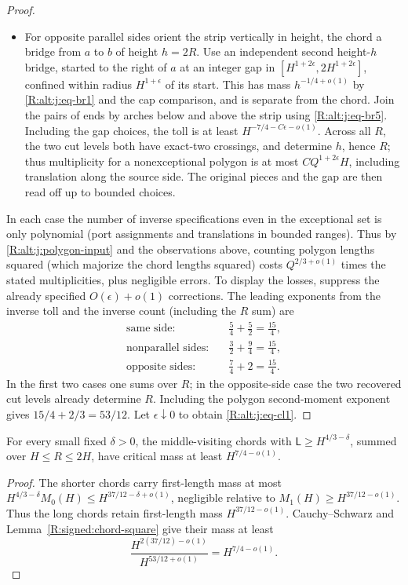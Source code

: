 \begin{proof}
\begin{itemize}
\item For opposite parallel sides orient the strip vertically in height, the chord a bridge from $a$ to $b$ of height $h=2R$. Use an independent second height-$h$ bridge, started to the right of $a$ at an integer gap in $[H^{1+2\epsilon},2H^{1+2\epsilon}]$, confined within radius $H^{1+\epsilon}$ of its start. This has mass $h^{-1/4+o(1)}$ by \eqref{R:alt:j:eq-br1} and the cap comparison, and is separate from the chord. Join the pairs of ends by arches below and above the strip using \eqref{R:alt:j:eq-br5}. Including the gap choices, the toll is at least $H^{-7/4-C\epsilon-o(1)}$. Across all $R$, the two cut levels both have exact-two crossings, and determine $h$, hence $R$; thus multiplicity for a nonexceptional polygon is at most $C Q^{1+2\epsilon}H$, including translation along the source side. The original pieces and the gap are then read off up to bounded choices.

\end{itemize}
In each case the number of inverse specifications even in the exceptional set is only polynomial (port assignments and translations in bounded ranges). Thus by \eqref{R:alt:j:polygon-input} and the observations above, counting polygon lengths squared (which majorize the chord lengths squared) costs $Q^{2/3+o(1)}$ times the stated multiplicities, plus negligible errors. To display the losses, suppress the already specified $O(\epsilon)+o(1)$ corrections. The leading exponents from the inverse toll and the inverse count (including the $R$ sum) are
\[
\begin{aligned}
\text{same side:}&\quad \tfrac54+\tfrac52=\tfrac{15}4,\\
\text{nonparallel sides:}&\quad \tfrac32+\tfrac94=\tfrac{15}4,\\
\text{opposite sides:}&\quad \tfrac74+2=\tfrac{15}4.
\end{aligned}
\]
In the first two cases one sums over $R$; in the opposite-side case the two recovered cut levels already determine $R$. Including the polygon second-moment exponent gives $15/4+2/3=53/12$. Let $\epsilon\downarrow0$ to obtain \eqref{R:alt:j:eq-cl1}.

\end{proof}

\begin{corollary}\label{R:signed:long-chords}
For every small fixed $\delta>0$, the middle-visiting chords with
$\mathsf L\ge H^{4/3-\delta}$, summed over $H\le R\le2H$, have critical
mass at least $H^{7/4-o(1)}$.
\end{corollary}
\begin{proof}
The shorter chords carry first-length mass at most
$H^{4/3-\delta}M_0(H)\le H^{37/12-\delta+o(1)}$, negligible relative to
$M_1(H)\ge H^{37/12-o(1)}$. Thus the long chords retain first-length mass
$H^{37/12-o(1)}$. Cauchy--Schwarz and
Lemma~\ref{R:signed:chord-square} give their mass at least
\[
 \frac{H^{2(37/12)-o(1)}}{H^{53/12+o(1)}}=H^{7/4-o(1)}.
\]
\end{proof}

